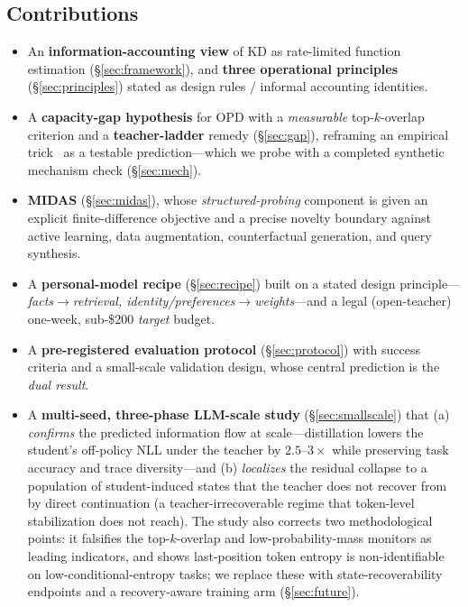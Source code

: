 \documentclass[11pt]{article}
\begin{document}
\subsection{Contributions}
\begin{itemize}
  \item An \textbf{information-accounting view} of KD as rate-limited function estimation (\S\ref{sec:framework}), and \textbf{three operational principles} (\S\ref{sec:principles}) stated as design rules / informal accounting identities.
  \item A \textbf{capacity-gap hypothesis} for OPD with a \emph{measurable} top-$k$-overlap criterion and a \textbf{teacher-ladder} remedy (\S\ref{sec:gap}), reframing an empirical trick~\cite{bridge2025} as a testable prediction---which we probe with a completed synthetic mechanism check (\S\ref{sec:mech}).
  \item \textbf{MIDAS} (\S\ref{sec:midas}), whose \emph{structured-probing} component is given an explicit finite-difference objective and a precise novelty boundary against active learning, data augmentation, counterfactual generation, and query synthesis.
  \item A \textbf{personal-model recipe} (\S\ref{sec:recipe}) built on a stated design principle---\emph{facts$\rightarrow$retrieval, identity/preferences$\rightarrow$weights}---and a legal (open-teacher) one-week, sub-\$200 \emph{target} budget.
  \item A \textbf{pre-registered evaluation protocol} (\S\ref{sec:protocol}) with success criteria and a small-scale validation design, whose central prediction is the \emph{dual result}.
  \item A \textbf{multi-seed, three-phase LLM-scale study} (\S\ref{sec:smallscale}) that (a) \emph{confirms} the predicted information flow at scale---distillation lowers the student's off-policy NLL under the teacher by $2.5$--$3\times$ while preserving task accuracy and trace diversity---and (b) \emph{localizes} the residual collapse to a population of student-induced states that the teacher does not recover from by direct continuation (a teacher-irrecoverable regime that token-level stabilization does not reach). The study also corrects two methodological points: it falsifies the top-$k$-overlap and low-probability-mass monitors as leading indicators, and shows last-position token entropy is non-identifiable on low-conditional-entropy tasks; we replace these with state-recoverability endpoints and a recovery-aware training arm (\S\ref{sec:future}).
\end{itemize}
\end{document}
